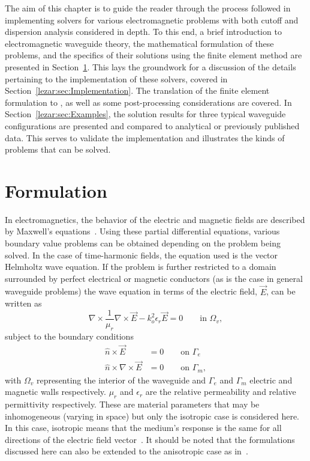 The aim of this chapter is to guide the reader through the process
followed in implementing solvers for various electromagnetic problems
with both cutoff and dispersion analysis considered in depth. To this
end, a brief introduction to electromagnetic waveguide theory, the
mathematical formulation of these problems, and the specifics of their
solutions using the finite element method are presented in
Section~\ref{lezar:sec:formulation}. This lays the groundwork for a
discussion of the details pertaining to the \fenics{} implementation
of these solvers, covered in
Section~\ref{lezar:sec:Implementation}. The translation of the finite
element formulation to \fenics{}, as well as some post-processing
considerations are covered. In Section~\ref{lezar:sec:Examples}, the
solution results for three typical waveguide configurations are
presented and compared to analytical or previously published
data. This serves to validate the implementation and illustrates the
kinds of problems that can be solved.

\section{Formulation}
\label{lezar:sec:formulation}

In electromagnetics, the behavior of the electric and magnetic fields
are described by Maxwell's equations~\citep{Jin2002, Smith1997}.
Using these partial differential equations, various boundary value
problems can be obtained depending on the problem being solved.
In the case of time-harmonic fields, the equation used is the vector
Helmholtz wave equation. If the problem
is further restricted to a domain surrounded by perfect electrical or
magnetic conductors (as is the case in general waveguide problems)
the wave equation in terms of the electric field, $\vec{E}$, can be
written as~\citep{Jin2002}
\begin{equation}
    \label{eq:lezar:vector_helmholtz}
    \nabla\times\frac{1}{\mu_r}\nabla\times\vec{E} - k_o^2\epsilon_r\vec{E} = 0\qquad \text{in
    $\Omega_v$},
\end{equation}
subject to the boundary conditions
\begin{align}
    \label{eq:lezar:electric_wall_BC}
    \hat{n}\times\vec{E} &= 0\qquad \text{on $\Gamma_{e}$}\\
    \label{eq:lezar:magnetic_wall_BC}
    \hat{n}\times\nabla\times{\vec{E}}{} &= 0\qquad \text{on $\Gamma_{m}$},
\end{align}
with $\Omega_v$ representing the interior of the waveguide and
$\Gamma_{e}$ and $\Gamma_{m}$ electric and magnetic walls
respectively. $\mu_r$ and $\epsilon_r$ are the relative permeability
and relative permittivity respectively.  These are material parameters
that may be inhomogeneous (varying in space) but only the isotropic
case is considered here. In this case, isotropic means that the
medium's response is the same for all directions of the electric field
vector~\citep{RamoWhinneryVanDuzer1994}. It should be noted that the
formulations discussed here can also be extended to the anisotropic
case as in~\citet{PolycarpouLyonsBalanis1996}.

